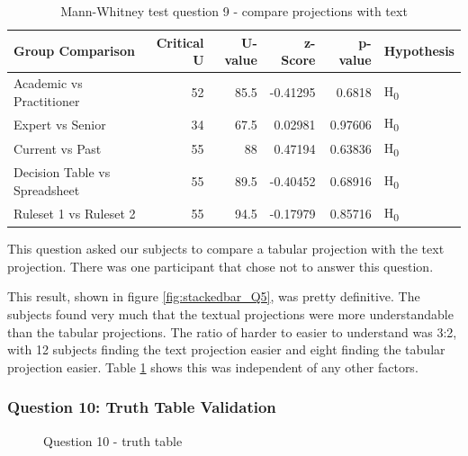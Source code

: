 \begin{table}
    \begin{center}
        \begin{tabular}{ |l ||r |r |r | r|l | } 
            \hline
            Group Comparison                 & Critical U & U-value & z-Score  & p-value & Hypothesis         \\
            \hline
            \hline
            Academic vs Practitioner         & 52         & 85.5    & -0.41295 & 0.6818  & H\textsubscript{0} \\ 
            \hline
            Expert vs Senior                 & 34         & 67.5    & 0.02981  & 0.97606 & H\textsubscript{0} \\ 
            \hline
            Current vs Past                  & 55         & 88      & 0.47194  & 0.63836 & H\textsubscript{0} \\ 
            \hline
            Decision Table vs Spreadsheet    & 55         & 89.5    & -0.40452 & 0.68916 & H\textsubscript{0} \\ 
            \hline
            Ruleset 1 vs Ruleset 2           & 55         & 94.5    & -0.17979 & 0.85716 & H\textsubscript{0} \\ 
            \hline
        \end{tabular}
    \end{center}
    \caption{Mann-Whitney test question 9 - compare projections with text}
    \label{table:mannwhitneyQ5}
\end{table}

This question asked our subjects to compare a tabular projection with the text projection.
There was one participant that chose not to answer this question.

This result, shown in figure \ref{fig:stackedbar_Q5}, was pretty definitive.
The subjects found very much that the textual projections were more understandable than the tabular projections.
The ratio of harder to easier to understand was 3:2, with 12 subjects finding the text projection easier and eight finding the tabular projection easier.
Table \ref{table:mannwhitneyQ5} shows this was independent of any other factors.

\subsubsection{Question 10: Truth Table Validation}

\begin{figure}
    \centering
    \caption{Question 10 - truth table}
    \label{fig:stackedbar_Q6}
\end{figure}

